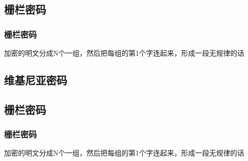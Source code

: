 \documentclass[slidestop,compress,mathserif]{beamer}
\begin{document}
%
%
%


\subsection{\hfill 栅栏密码}
\begin{frame}
  \frametitle{栅栏密码}
加密的明文分成N个一组，然后把每组的第1个字连起来，形成一段无规律的话
\end{frame}

\subsection{\hfill 维基尼亚密码}


\subsection{\hfill 栅栏密码}
\begin{frame}
  \frametitle{栅栏密码}
加密的明文分成N个一组，然后把每组的第1个字连起来，形成一段无规律的话
\end{frame}
\end{document}
